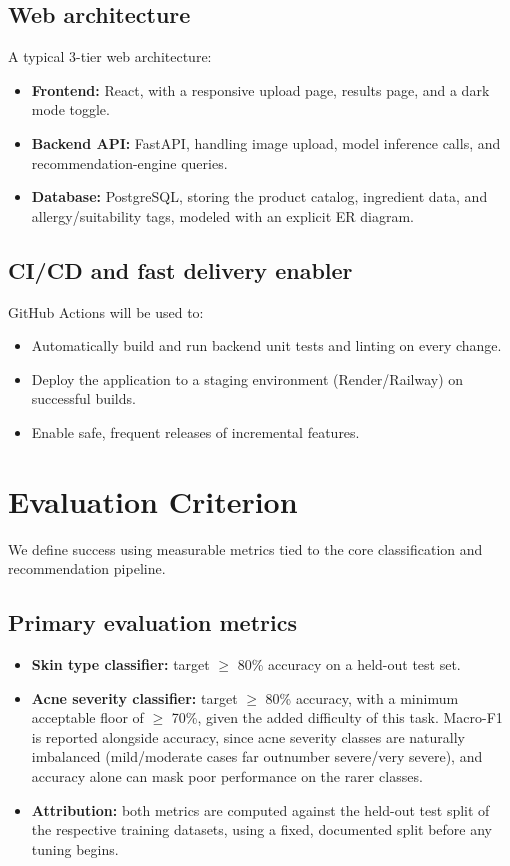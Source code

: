 \documentclass[11pt,a4paper]{article}
\begin{document}
\subsection{Web architecture}
A typical 3-tier web architecture:
\begin{itemize}[leftmargin=0.7cm]
    \item \textbf{Frontend:} React, with a responsive upload page, results page, and a dark mode toggle.
    \item \textbf{Backend API:} FastAPI, handling image upload, model inference calls, and recommendation-engine queries.
    \item \textbf{Database:} PostgreSQL, storing the product catalog, ingredient data, and allergy/suitability tags, modeled with an explicit ER diagram.
\end{itemize}

\subsection{CI/CD and fast delivery enabler}
GitHub Actions will be used to:
\begin{itemize}[leftmargin=0.7cm]
    \item Automatically build and run backend unit tests and linting on every change.
    \item Deploy the application to a staging environment (Render/Railway) on successful builds.
    \item Enable safe, frequent releases of incremental features.
\end{itemize}

\section{Evaluation Criterion}
We define success using measurable metrics tied to the
core classification and recommendation pipeline.

\subsection{Primary evaluation metrics}
\begin{itemize}[leftmargin=0.7cm]
    \item \textbf{Skin type classifier:} target $\geq$ 80\% accuracy on a held-out test set.
    \item \textbf{Acne severity classifier:} target $\geq$ 80\% accuracy, with a minimum acceptable floor of $\geq$ 70\%, given the added difficulty of this task. Macro-F1 is reported alongside accuracy, since acne severity classes are naturally imbalanced (mild/moderate cases far outnumber severe/very severe), and accuracy alone can mask poor performance on the rarer classes.
    \item \textbf{Attribution:} both metrics are computed against the held-out test split of the respective training datasets, using a fixed, documented split before any tuning begins.
\end{itemize}
\end{document}
